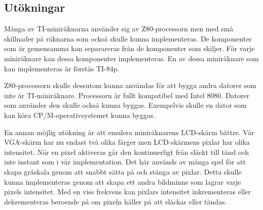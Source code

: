 \documentclass[main.tex]{subfiles}
\begin{document}
\subsection{Utökningar}
Många av TI-miniräknarna använder sig av Z80-processorn men med små skillnader
på räknarna som också skulle kunna implementeras. De komponenter som är
gemensamma kan separareras från de komponenter som skiljer. För varje
miniräknare kan dessa komponenter implementeras. En av dessa miniräknare som
kan implementeras är förstås TI-84p.

Z80-processorn skulle dessutom kunna användas för att bygga andra datorer som
inte är TI-miniräknare. Processorn är fullt kompatibel med Intel 8080. Datorer
som använder den skulle också kunna byggas. Exempelvis skulle en dator som kan
köra CP/M-operativsystemet kunna byggas.

En annan möjlig utökning är att emulera miniräknarens LCD-skärm bättre. Vår
VGA-skärm har nu endast två olika färger men LCD-skärmens pixlar har olika
intensitet. När en pixel aktiveras går den kontinuerligt från släckt till tänd
och inte instant som i vår implementation. Det här används av många spel för
att skapa gråskala genom att snabbt sätta på och stänga av pixlar. Detta skulle
kunna implementeras genom att skapa ett andra bildminne som lagrar varje pixels
intensitet. Med en viss frekvens kan pixlars intensitet inkrementeras eller
dekrementeras beroende på om pixeln håller på att släckas eller tändas.
\end{document}
